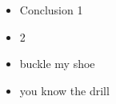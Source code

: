 \begin{itemize}
    \item Conclusion 1
    \item 2
    \item buckle my shoe
    \item you know the drill
\end{itemize}
